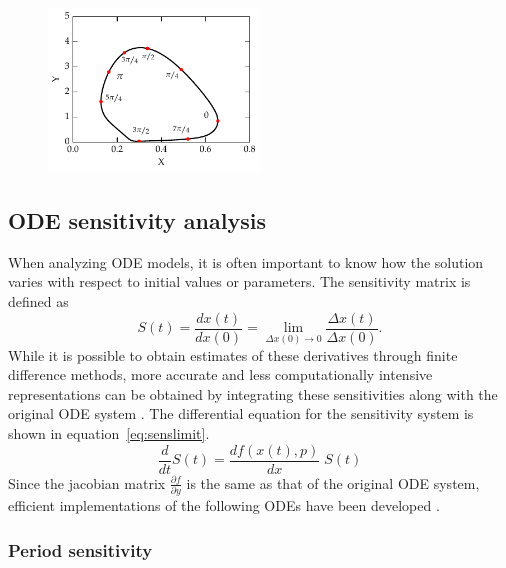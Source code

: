\begin{figure}[tbp]
  \centering
  \includegraphics[width=0.5\textwidth]{chap1/figures/phase_def.pdf}
  \label{fig:phasedef}
\end{figure}


\subsection{ODE sensitivity analysis}

When analyzing ODE models, it is often important to know how the solution varies with respect to initial values or parameters. 
The sensitivity matrix is defined as
\begin{equation}
  S(t) = \frac{dx(t)}{dx(0)} = \lim_{\Delta x(0) \to 0}\frac{\Delta x(t)}{\Delta x(0)}.
  \label{eq:senslimit}
\end{equation}
While it is possible to obtain estimates of these derivatives through finite difference methods, more accurate and less computationally intensive representations can be obtained by integrating these sensitivities along with the original ODE system \cite{Dickinson1976}. 
The differential equation for the sensitivity system is shown in equation~\ref{eq:senslimit}. 
\begin{equation}
  \frac{d}{dt} S(t)  = \frac{df(x(t),p)}{dx}\; S(t)
  \label{eq:odesens}
\end{equation}
Since the jacobian matrix $\frac{\partial f}{\partial y}$ is the same as that of the original ODE system, efficient implementations of the following ODEs have been developed \cite{Feehery1997}.

\subsubsection{Period sensitivity}

